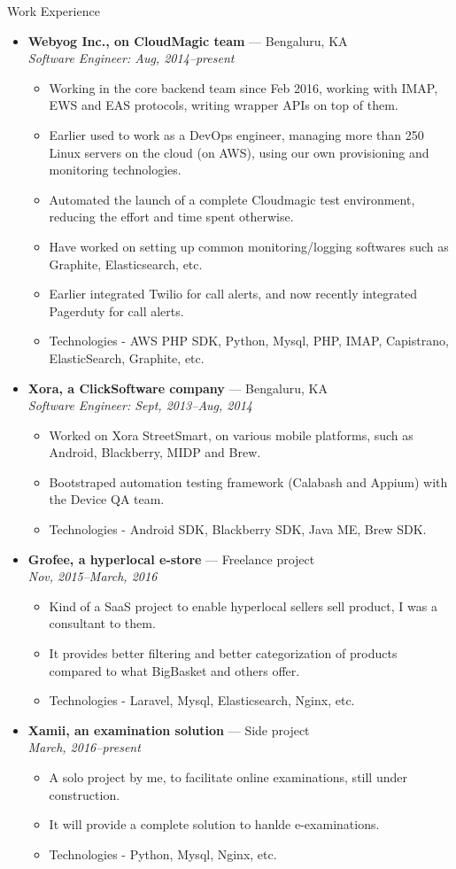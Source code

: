 \documentclass[a4paper,11pt,oneside]{article}
\newenvironment{ressection}[1]{
  \vspace{4pt}
         {\fontfamily{phv}\selectfont\Large#1}
         \begin{itemize}
           \vspace{3pt}
}{
         \end{itemize}
}
\newcommand{\ressubitem}[1]{
  \vspace{-1pt}
\item \begin{flushleft} #1 \end{flushleft}
}
\newcommand{\resbigitem}[3]{
  \vspace{-5pt}
\item
  \textbf{#1} --- #2 \\
  \textit{#3}
}
\newenvironment{ressubsec}[3]{
  \resbigitem{#1}{#2}{#3}
  \vspace{-2pt}
  \begin{itemize}
}{
  \end{itemize}
}
\begin{document}
\begin{ressection}{Work Experience}
  \begin{ressubsec}{Webyog Inc., on CloudMagic team}{Bengaluru, KA}{Software Engineer: Aug, 2014--present}
    \ressubitem{Working in the core backend team since Feb 2016, working with IMAP, EWS and EAS protocols, writing wrapper APIs on top of them.}
    \ressubitem{Earlier used to work as a DevOps engineer, managing more than 250 Linux servers on the cloud (on AWS), using our own provisioning and monitoring technologies.}
    \ressubitem{Automated the launch of a complete Cloudmagic test environment, reducing the effort and time spent otherwise.}
    \ressubitem{Have worked on setting up common monitoring/logging softwares such as Graphite, Elasticsearch, etc.}
    \ressubitem{Earlier integrated Twilio for call alerts, and now recently integrated Pagerduty for call alerts.}
    \ressubitem{Technologies - AWS PHP SDK, Python, Mysql, PHP, IMAP, Capistrano, ElasticSearch, Graphite, etc.}
  \end{ressubsec}
  \begin{ressubsec}{Xora, a ClickSoftware company}{Bengaluru, KA}{Software Engineer: Sept, 2013--Aug, 2014}
    \ressubitem{Worked on Xora StreetSmart, on various mobile platforms, such as Android, Blackberry, MIDP and Brew.}
    \ressubitem{Bootstraped automation testing framework (Calabash and Appium) with the Device QA team.}
    \ressubitem{Technologies - Android SDK, Blackberry SDK, Java ME, Brew SDK.}
  \end{ressubsec}
  \begin{ressubsec}{Grofee, a hyperlocal e-store}{Freelance project}{Nov, 2015--March, 2016}
    \ressubitem{Kind of a SaaS project to enable hyperlocal sellers sell product, I was a consultant to them.}
    \ressubitem{It provides better filtering and better categorization of products compared to what BigBasket and others offer.}
    \ressubitem{Technologies - Laravel, Mysql, Elasticsearch, Nginx, etc.}
  \end{ressubsec}
  \begin{ressubsec}{Xamii, an examination solution}{Side project}{March, 2016--present}
    \ressubitem{A solo project by me, to facilitate online examinations, still under construction.}
    \ressubitem{It will provide a complete solution to hanlde e-examinations.}
    \ressubitem{Technologies - Python, Mysql, Nginx, etc.}
  \end{ressubsec}

\end{ressection}
\end{document}
